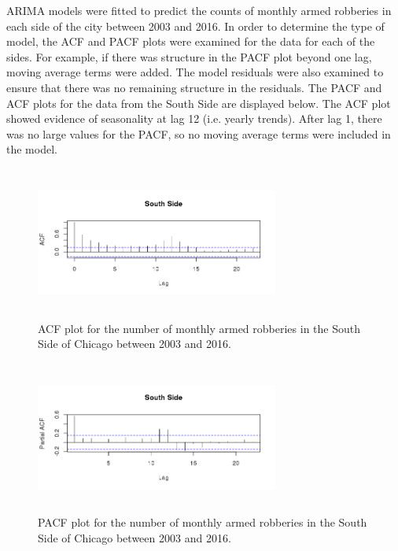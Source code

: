 \documentclass{article} %
\begin{document}
\noindent ARIMA models were fitted to predict the counts of monthly armed robberies in each side of the city between 2003 and 2016. In order to determine the type of model, the ACF and PACF plots were examined for the data for each of the sides. For example, if there was structure in the PACF plot beyond one lag, moving average terms were added. The model residuals were also examined to ensure that there was no remaining structure in the residuals. The PACF and ACF plots for the data from the South Side are displayed below. The ACF plot showed evidence of seasonality at lag 12 (i.e. yearly trends). After lag 1, there was no large values for the PACF, so no moving average terms were included in the model. \newline\newline\newline
\clearpage\newpage
\begin{multicols}{2}
\begin{figure}[H]
\includegraphics[height=50mm, width=80mm]{Plots/south_ACF.png}
\caption{ACF plot for the number of monthly armed robberies in the South Side of Chicago between 2003 and 2016.}
\end{figure}

\begin{figure}[H]
\includegraphics[height=50mm, width=80mm]{Plots/south_PACF.png}
\caption{PACF plot for the number of monthly armed robberies in the South Side of Chicago between 2003 and 2016.}
\end{figure}
\end{multicols}
\end{document}
